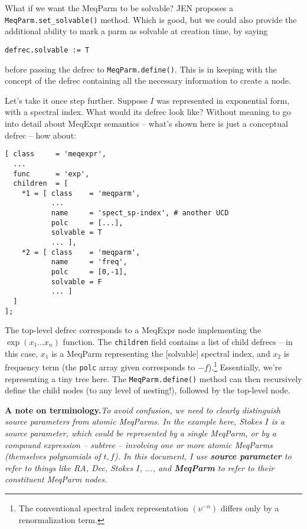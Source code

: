 \documentclass[]{lofar}
\begin{document}
  What if we want the MeqParm to be solvable? JEN \cite{PSS4} proposes a {\tt
  MeqParm.set\_solvable()} method. Which is good, but we could also provide the
  additional ability to mark a parm as solvable at creation time, by saying
  
\begin{verbatim}
defrec.solvable := T
\end{verbatim}
  
  before passing the defrec to {\tt MeqParm.define()}. This is in keeping with
  the concept of the defrec containing all the necessary information to create a
  node.
  
  Let's take it once step further. Suppose $I$ was represented in exponential
  form, with a spectral index. What would its defrec look like? Without meaning
  to go into detail about MeqExpr semantics -- what's shown here is just a
  conceptual defrec -- how about:
  
\begin{verbatim}
[ class     = 'meqexpr',
  ...
  func      = 'exp',
  children  = [ 
    *1 = [ class    = 'meqparm',
           ...
           name     = 'spect_sp-index', # another UCD
           polc     = [...],
           solvable = T
           ... ],
    *2 = [ class    = 'meqparm',
           name     = 'freq',           
           polc     = [0,-1],
           solvable = F
           ... ] 
  ]
];
\end{verbatim}
  
  The top-level defrec corresponds to a MeqExpr node implementing the
  $\exp({x_1...x_n})$ function. The {\tt children} field contains a list of
  child defrecs -- in this case, $x_1$ is a MeqParm representing the [solvable]
  spectral index, and $x_2$ is frequency term (the {\tt polc} array given
  corresponds to $-f$).\footnote{The conventional spectral index representation 
  $(\nu^{-n})$ differs only by a renormalization term.} Essentially, we're
  representing a tiny tree here. The {\tt MeqParm.define()} method can then
  recursively define the child nodes (to any level of nesting!), followed by
  the top-level node.

  {\bf A note on terminology.}{\em To avoid confusion, we need to clearly 
  distinguish source parameters from atomic MeqParms. In the example here, Stokes
  $I$ is a source parameter, which could be represented by a single MeqParm, or
  by a compound expression -- subtree -- involving one or more atomic MeqParms
  (themselves polynomials of $t,f$). In this document, I use {\bf source
  parameter} to refer to things like RA, Dec, Stokes $I$, ..., and {\bf MeqParm} to
  refer to their constituent MeqParm nodes.}
  
\end{document}
